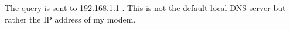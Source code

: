 The query is sent to 192.168.1.1 . This is not the default local DNS server but rather the IP address of my modem.